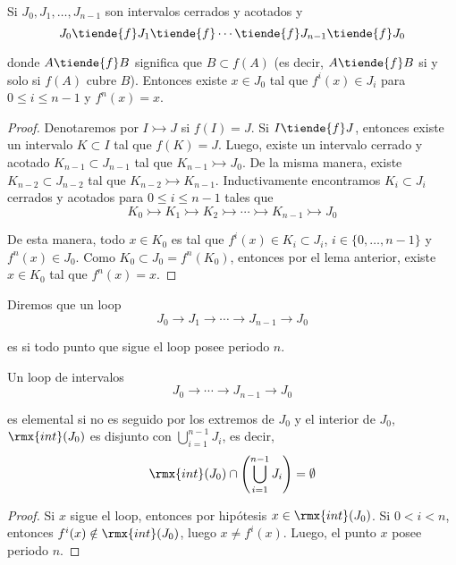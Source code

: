 \documentclass[	docname= Sistemas\ Din\'amicos,
				finished=1,
				semester=1,
				year=2017,
				professor=Godofredo\ Iommi,
				sigla=MAT2565]{apunte}
\begin{document}
\begin{lem}  Si $J_{0} , J_{1}, \ldots, J_{n-1}$ son intervalos cerrados y acotados y 
	$$J_{0} \tiende{f} J_{1} \tiende{f} \cdots \tiende{f} J_{n-1} \tiende{f} J_{0}$$

donde $A \tiende{f} B$ significa que $B \subset f(A)$ (es decir, $A \tiende{f} B$ si y solo si $f(A)$ cubre $B$). Entonces existe $x \in J_{0}$ tal que $f^{i}(x) \in J_{i}$ para $0 \leq i \leq n-1$ y $f^{n}(x) = x$.
\end{lem}

\begin{proof} Denotaremos por $I \rightarrowtail J$ si $f(I) = J$. Si $I \tiende{f} J$, entonces existe un intervalo $K \subset I$ tal que $f(K) = J$. Luego, existe un intervalo cerrado y acotado $K_{n-1} \subset J_{n-1}$ tal que $K_{n-1} \rightarrowtail J_{0}$. De la misma manera, existe $K_{n-2} \subset J_{n-2}$ tal que $K_{n-2} \rightarrowtail K_{n-1}$. Inductivamente encontramos $K_{i} \subset J_{i}$ cerrados y acotados para $0 \leq i \leq n-1$ tales que 
	$$K_{0} \rightarrowtail K_{1} \rightarrowtail K_{2} \rightarrowtail \cdots \rightarrowtail K_{n-1} \rightarrowtail J_{0}$$

De esta manera, todo $x \in K_{0}$ es tal que $f^{i}(x) \in K_{i} \subset J_{i}$, $i \in \{0, \ldots, n-1\}$ y $f^{n}(x) \in J_{0}$. Como $K_{0} \subset J_{0} = f^{n}(K_{0})$, entonces por el lema anterior, existe $x \in K_{0}$ tal que $f^{n}(x) = x$.
\end{proof}

\begin{defn} Diremos que un loop 
	$$J_{0} \to J_{1} \to \cdots \to J_{n-1} \to J_{0}$$

es  si todo punto que sigue el loop posee periodo $n$.
\end{defn}

\begin{lem}  Un loop de intervalos
	$$J_{0} \to \cdots \to J_{n-1} \to J_{0}$$

es elemental si no es seguido por los extremos de $J_{0}$ y el interior de $J_{0}$, $\rmx{int}(J_{0})$ es disjunto con $\bigcup_{i=1}^{n-1} J_{i}$, es decir,
	$$\rmx{int}(J_{0}) \cap \left(\bigcup_{i=1}^{n-1} J_{i}\right) = \emptyset$$
\end{lem}

\begin{proof} Si $x$ sigue el loop, entonces por hipótesis $x \in \rmx{int}(J_{0})$. Si $0 < i < n$, entonces $f^{i}(x) \notin \rmx{int}(J_{0})$, luego $x \neq f^{i}(x)$. Luego, el punto $x$ posee periodo $n$.
\end{proof}
\end{document}
